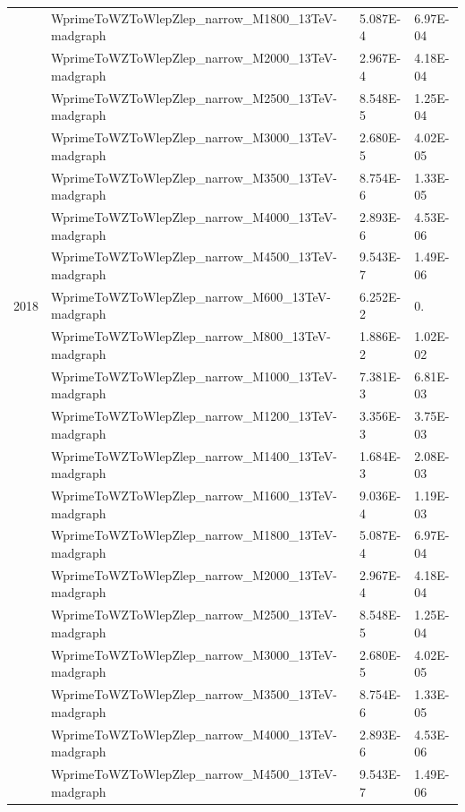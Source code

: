 \begin{table}
\begin{center}
\begin{tabular}{|l|l|l|l|}
 &WprimeToWZToWlepZlep\_narrow\_M1800\_13TeV-madgraph & 5.087E-4 & 6.97E-04\\
 &WprimeToWZToWlepZlep\_narrow\_M2000\_13TeV-madgraph & 2.967E-4 & 4.18E-04\\
 &WprimeToWZToWlepZlep\_narrow\_M2500\_13TeV-madgraph & 8.548E-5 & 1.25E-04\\
 &WprimeToWZToWlepZlep\_narrow\_M3000\_13TeV-madgraph & 2.680E-5 & 4.02E-05\\
 &WprimeToWZToWlepZlep\_narrow\_M3500\_13TeV-madgraph & 8.754E-6 & 1.33E-05\\
 &WprimeToWZToWlepZlep\_narrow\_M4000\_13TeV-madgraph & 2.893E-6 & 4.53E-06\\
 &WprimeToWZToWlepZlep\_narrow\_M4500\_13TeV-madgraph & 9.543E-7 & 1.49E-06\\
\hline
2018 & WprimeToWZToWlepZlep\_narrow\_M600\_13TeV-madgraph  & 6.252E-2 & 0. \\
 &WprimeToWZToWlepZlep\_narrow\_M800\_13TeV-madgraph  & 1.886E-2 & 1.02E-02\\
 &WprimeToWZToWlepZlep\_narrow\_M1000\_13TeV-madgraph & 7.381E-3 & 6.81E-03\\
 &WprimeToWZToWlepZlep\_narrow\_M1200\_13TeV-madgraph & 3.356E-3 & 3.75E-03\\
 &WprimeToWZToWlepZlep\_narrow\_M1400\_13TeV-madgraph & 1.684E-3 & 2.08E-03\\
 &WprimeToWZToWlepZlep\_narrow\_M1600\_13TeV-madgraph & 9.036E-4 & 1.19E-03\\
 &WprimeToWZToWlepZlep\_narrow\_M1800\_13TeV-madgraph & 5.087E-4 & 6.97E-04\\
 &WprimeToWZToWlepZlep\_narrow\_M2000\_13TeV-madgraph & 2.967E-4 & 4.18E-04\\
 &WprimeToWZToWlepZlep\_narrow\_M2500\_13TeV-madgraph & 8.548E-5 & 1.25E-04\\
 &WprimeToWZToWlepZlep\_narrow\_M3000\_13TeV-madgraph & 2.680E-5 & 4.02E-05\\
 &WprimeToWZToWlepZlep\_narrow\_M3500\_13TeV-madgraph & 8.754E-6 & 1.33E-05\\
 &WprimeToWZToWlepZlep\_narrow\_M4000\_13TeV-madgraph & 2.893E-6 & 4.53E-06\\
 &WprimeToWZToWlepZlep\_narrow\_M4500\_13TeV-madgraph & 9.543E-7 & 1.49E-06\\
\hline
\end{tabular}
\label{tab:SignalList}
\end{center}
\end{table}

